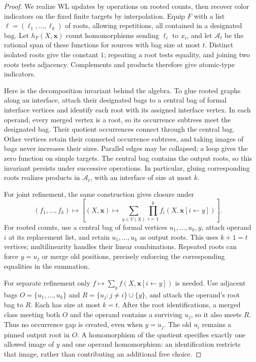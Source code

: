 \begin{proof}
We realize WL updates by operations on rooted counts, then recover
color indicators on the fixed finite targets by interpolation.
Equip \(F\) with a list \(\boldsymbol\ell=(\ell_1,\ldots,\ell_k)\) of
roots, allowing repetitions, all contained in a designated bag.
Let \(h_F(X,\mathbf x)\) count homomorphisms sending \(\ell_i\) to \(x_i\),
and let \(\mathcal A_t\) be the rational span of these functions for
sources with bag size at most \(t\).
Distinct isolated roots give the constant \(1\); repeating a root tests
equality, and joining two roots tests adjacency. Complements and products
therefore give atomic-type indicators.

Here is the decomposition invariant behind the algebra.
To glue rooted graphs along an interface, attach their designated bags
to a central bag of formal interface vertices and identify each root
with its assigned interface vertex. In each operand, every merged
vertex is a root, so its occurrence subtrees meet the designated bag.
Their quotient occurrences connect through the central bag. Other
vertices retain their connected occurrence subtrees, and taking images
of bags never increases their sizes. Parallel edges may be collapsed;
a loop gives the zero function on simple targets. The central bag
contains the output roots, so this invariant persists under successive
operations. In particular, gluing corresponding roots realizes products
in \(\mathcal A_t\), with an interface of size at most \(k\).

For joint refinement, the same construction gives closure under
\[
 (f_1,\ldots,f_k)\longmapsto
 \left[(X,\mathbf x)\longmapsto
       \sum_{y\in V(X)}\prod_{i=1}^k
                      f_i(X,\mathbf x[i\leftarrow y])\right].
\]
For rooted counts, use a central bag of formal vertices
\(u_1,\ldots,u_k,y\), attach operand \(i\) at its replacement list, and
retain \(u_1,\ldots,u_k\) as output roots. This uses \(k+1=t\) vertices;
multilinearity handles their linear combinations.
Repeated roots can force \(y=u_j\) or merge old positions, precisely
enforcing the corresponding equalities in the summation.

For separate refinement only
\(f\mapsto\sum_y f(X,\mathbf x[i\leftarrow y])\) is needed.
Use adjacent bags
\(O=\{u_1,\ldots,u_k\}\) and
\(R=\{u_j:j\ne i\}\cup\{y\}\), and attach the operand's root bag to \(R\).
Each has size at most \(k=t\).
After the root identifications, a merged class meeting both \(O\)
and the operand contains a surviving \(u_j\), so it also meets \(R\).
Thus no occurrence gap is created, even when \(y=u_j\).
The old \(u_i\) remains a pinned output root in \(O\).
A homomorphism of the quotient specifies exactly one allowed image
of \(y\) and one operand homomorphism: an identification restricts that
image, rather than contributing an additional free choice.


\end{proof}
